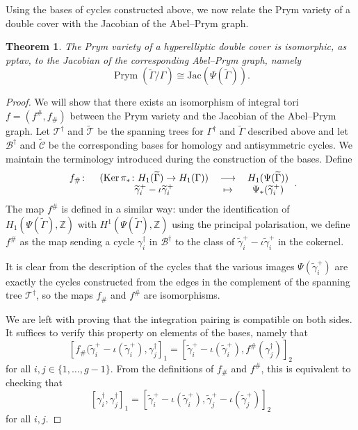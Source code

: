\documentclass[11pt]{article}
\newtheorem{theorem}[theo]{Theorem}
\theoremstyle{definition}
\numberwithin{equation}{section}
\theoremstyle{definition}
\newcommand{\tGa}{\widetilde{\Gamma}}
\newcommand{\tga}{\widetilde{\gamma}}
\newcommand{\Ga}{\Gamma}
\newcommand{\calB}{\mathcal{B}}
\newcommand{\calC}{\mathcal{C}}
\newcommand{\calT}{\mathcal{T}}
\newcommand{\wt}[1]{\widetilde{#1}}
\DeclareMathOperator{\Prym}{Prym}
\begin{document}
Using the bases of cycles constructed above, we now relate the Prym variety of a double cover with the Jacobian of the Abel--Prym graph. 


\begin{theorem}
\label{pptavs}
    The Prym variety of a hyperelliptic double cover is isomorphic, as pptav, to the Jacobian of the corresponding Abel--Prym graph, namely
    \[
    \Prym(\tGa/\Ga)\cong \mathrm{Jac}(\Psi(\tGa)).
    \]
\end{theorem}

    \begin{proof}
        We will show that there exists an isomorphism of integral tori $f=(f^{\#},f_{\#})$ between the Prym variety and the Jacobian of the Abel--Prym graph. Let $\calT^{\dagger}$ and $\wt\calT$ be the spanning trees for $\Gamma^{\dagger}$ and $\wt\Gamma$ described above and let $\calB^{\dagger}$ and $\wt\calC$ be the corresponding bases for homology and antisymmetric cycles. 
       We  maintain the  terminology introduced during the construction of the bases. 
         Define
\[
 \begin{tabular}{cccc}
	    $f_{\#} \colon$&$(\mathrm{Ker}\,\pi_*\colon H_1(\tGa)\to H_1(\Ga))$&$\longrightarrow$&$H_1(\Psi(\wt\Gamma))$  \\
	         &$\tga_{i}^+-\iota \tga_{i}^+$&$\mapsto$&$\Psi_*(\tga_{i}^+)$
	    \end{tabular}.
\]
The map $f^\#$ is defined  in a similar way:
under the identification of $H_1(\Psi(\tGa),\mathbb Z)$  with $H^1(\Psi(\tGa),\mathbb Z)$ using the principal polarisation, we define $f^{\#}$ as the map sending a cycle $\gamma_i^{\dagger}$ in $\calB^{\dagger}$  to the class of $\wt\gamma_i^+ - \iota\wt\gamma_i^+$ in the cokernel. 

It is clear from the description of the cycles that the various images $\Psi(\wt\gamma_i^+)$ are exactly the cycles constructed from the edges in the complement of the spanning tree $\calT^{\dagger}$, so  the maps $f_{\#}$ and $f^{\#}$ are isomorphisms. 

We are left with proving that the integration pairing is compatible on both sides.
It suffices to verify this property on elements of the bases, namely that
\[
[f_{\#}(\wt\gamma_i^{+} - \iota(\wt\gamma_i^{+}), \gamma_j^{\dagger}]_1 =
[\wt\gamma_i^{+} - \iota(\wt\gamma_i^{+}), f^{\#}(\gamma_j^{\dagger})]_2 
\]
for all $i,j\in\{1,\ldots,g-1\}$. From the definitions of $f_{\#}$ and $f^{\#}$, this is equivalent to checking that
\[
[\gamma_i^{\dagger}, \gamma_j^{\dagger}]_1 =
[\wt\gamma_i^{+} - \iota(\wt\gamma_i^{+}), \wt\gamma_j^{+} - \iota(\wt\gamma_j^{+})]_2
\]
for all $i,j$.


\end{proof}
\end{document}

